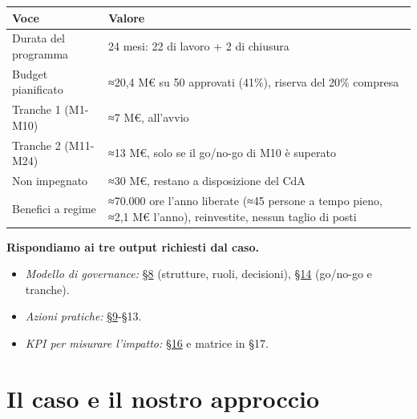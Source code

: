 \documentclass[11pt,a4paper]{article}
\begin{document}
{\small\renewcommand{\arraystretch}{1.25}
\begin{xltabular}{\linewidth}{@{}>{\raggedright\arraybackslash{}\hsize\hspace{0pt}}X>{\raggedright\arraybackslash{}\hsize\hspace{0pt}}X@{}}
\toprule
\textbf{Voce} & \textbf{Valore} \\
\midrule
\endhead
Durata del programma & 24 mesi: 22 di lavoro + 2 di chiusura \\
Budget pianificato & ≈20,4 M€ su 50 approvati (41\%), riserva del 20\% compresa \\
Tranche 1 (M1-M10) & ≈7 M€, all'avvio \\
Tranche 2 (M11-M24) & ≈13 M€, solo se il go/no-go di M10 è superato \\
Non impegnato & ≈30 M€, restano a disposizione del CdA \\
Benefici a regime & ≈70.000 ore l'anno liberate (≈45 persone a tempo pieno, ≈2,1 M€ l'anno), reinvestite, nessun taglio di posti \\
\bottomrule
\end{xltabular}}

\textbf{Rispondiamo ai tre output richiesti dal caso.}
\begin{itemize}
\item \emph{Modello di governance:} \hyperref[sec:8]{\S8} (strutture, ruoli, decisioni), \hyperref[sec:14]{\S14} (go/no-go e tranche).
\item \emph{Azioni pratiche:} \hyperref[sec:9]{\S9}-§13.
\item \emph{KPI per misurare l'impatto:} \hyperref[sec:16]{\S16} e matrice in §17.
\end{itemize}

\section{Il caso e il nostro approccio}\label{sec:2}
\end{document}
